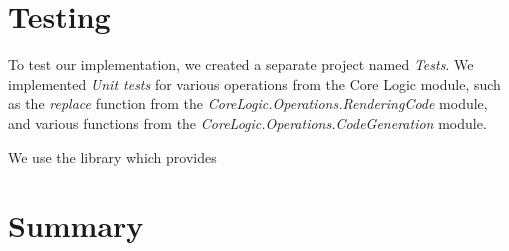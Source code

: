 \section{Testing}
To test our implementation, we created a separate project named \emph{Tests}.
We implemented \emph{Unit tests} for various operations from the Core Logic module, such as the \emph{replace} function from the \emph{CoreLogic.Operations.RenderingCode} module, and various functions from the \emph{CoreLogic.Operations.CodeGeneration} module.

We use the \citet{mocha} library which provides
\section{Summary}
